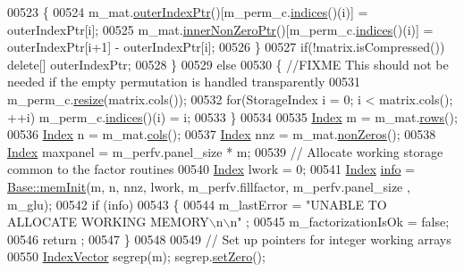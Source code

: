 \begin{DoxyCode}
00523     \{
00524       m\_mat.\hyperlink{group___sparse_core___module_a75506964d86d6badb32d0b4917acf2e2}{outerIndexPtr}()[m\_perm\_c.\hyperlink{group___core___module_a2f1ab379207fcd1ceb33941e25cf50c2}{indices}()(i)] = outerIndexPtr[i];
00525       m\_mat.\hyperlink{group___sparse_core___module_a218204b051a24f579c394454786eeda0}{innerNonZeroPtr}()[m\_perm\_c.\hyperlink{group___core___module_a2f1ab379207fcd1ceb33941e25cf50c2}{indices}()(i)] = outerIndexPtr[i+1] - 
      outerIndexPtr[i];
00526     \}
00527     \textcolor{keywordflow}{if}(!matrix.isCompressed()) \textcolor{keyword}{delete}[] outerIndexPtr;
00528   \} 
00529   \textcolor{keywordflow}{else} 
00530   \{ \textcolor{comment}{//FIXME This should not be needed if the empty permutation is handled transparently}
00531     m\_perm\_c.\hyperlink{group___core___module_a0e0fda6e84d69e02432e4770359bb532}{resize}(matrix.cols());
00532     \textcolor{keywordflow}{for}(StorageIndex i = 0; i < matrix.cols(); ++i) m\_perm\_c.\hyperlink{group___core___module_a2f1ab379207fcd1ceb33941e25cf50c2}{indices}()(i) = i;
00533   \}
00534   
00535   \hyperlink{namespace_eigen_a62e77e0933482dafde8fe197d9a2cfde}{Index} m = m\_mat.\hyperlink{group___sparse_core___module_a62e61bb861eee306d5b069ce652b5aa5}{rows}();
00536   \hyperlink{namespace_eigen_a62e77e0933482dafde8fe197d9a2cfde}{Index} n = m\_mat.\hyperlink{group___sparse_core___module_aa391750e3c530227e4a5c3c52e959975}{cols}();
00537   \hyperlink{namespace_eigen_a62e77e0933482dafde8fe197d9a2cfde}{Index} nnz = m\_mat.\hyperlink{group___sparse_core___module_a03de8b3da2c142ce8698a76123b3e7d3}{nonZeros}();
00538   \hyperlink{namespace_eigen_a62e77e0933482dafde8fe197d9a2cfde}{Index} maxpanel = m\_perfv.panel\_size * m;
00539   \textcolor{comment}{// Allocate working storage common to the factor routines}
00540   \hyperlink{namespace_eigen_a62e77e0933482dafde8fe197d9a2cfde}{Index} lwork = 0;
00541   \hyperlink{namespace_eigen_a62e77e0933482dafde8fe197d9a2cfde}{Index} \hyperlink{group___sparse_l_u___module_ab0d0c1744ffd5a1dff578a44bcef2a3d}{info} = \hyperlink{group___sparse_l_u___module_ac018b8ed9664d4e19e34f1ff2d6c578a}{Base::memInit}(m, n, nnz, lwork, m\_perfv.fillfactor, m\_perfv.panel\_size
      , m\_glu); 
00542   \textcolor{keywordflow}{if} (info) 
00543   \{
00544     m\_lastError = \textcolor{stringliteral}{"UNABLE TO ALLOCATE WORKING MEMORY\(\backslash\)n\(\backslash\)n"} ;
00545     m\_factorizationIsOk = \textcolor{keyword}{false};
00546     return ; 
00547   \}
00548   
00549   \textcolor{comment}{// Set up pointers for integer working arrays }
00550   \hyperlink{group___core___module}{IndexVector} segrep(m); segrep.\hyperlink{class_eigen_1_1_plain_object_base_ac21ad5f989f320e46958b75ac8d9a1da}{setZero}();

\end{DoxyCode}
